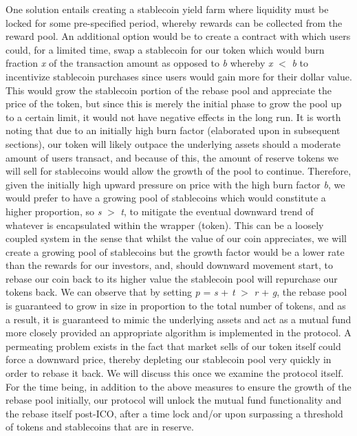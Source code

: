 \documentclass[12pt]{article}
\begin{document}
    \vspace{0.15cm}
    One solution entails creating a stablecoin yield farm where liquidity must be locked for some pre-specified period, whereby rewards can be collected from the reward pool. An additional option would be to create a contract with which users could, for a limited time, swap a stablecoin for our token which would burn fraction \emph{x} of the transaction amount as opposed to \emph{b} whereby \emph{x} $<$ \emph{b} to incentivize stablecoin purchases since users would gain more for their dollar value. This would grow the stablecoin portion of the rebase pool and appreciate the price of the token, but since this is merely the initial phase to grow the pool up to a certain limit, it would not have negative effects in the long run. It is worth noting that due to an initially high burn factor (elaborated upon in subsequent sections), our token will likely outpace the underlying assets should a moderate amount of users transact, and because of this, the amount of reserve tokens we will sell for stablecoins would allow the growth of the pool to continue. Therefore, given the initially high upward pressure on price with the high burn factor \emph{b}, we would prefer to have a growing pool of stablecoins which would constitute a higher proportion, so \emph{s} $>$ \emph{t}, to mitigate the eventual downward trend of whatever is encapsulated within the wrapper (token). This can be a loosely coupled system in the sense that whilst the value of our coin appreciates, we will create a growing pool of stablecoins but the growth factor would be a lower rate than the rewards for our investors, and, should downward movement start, to rebase our coin back to its higher value the stablecoin pool will repurchase our tokens back. We can observe that by setting \emph{p} = \emph{s} + \emph{t} $>$ \emph{r} + \emph{g}, the rebase pool is guaranteed to grow in size in proportion to the total number of tokens, and as a result, it is guaranteed to mimic the underlying assets and act as a mutual fund more closely provided an appropriate algorithm is implemented in the protocol. A permeating problem exists in the fact that market sells of our token itself could force a downward price, thereby depleting our stablecoin pool very quickly in order to rebase it back. We will discuss this once we examine the protocol itself. For the time being, in addition to the above measures to ensure the growth of the rebase pool initially, our protocol will unlock the mutual fund functionality and the rebase itself post-ICO, after a time lock and/or upon surpassing a threshold of tokens and stablecoins that are in reserve. 
    \vspace{0.15cm}
    
\end{document}
